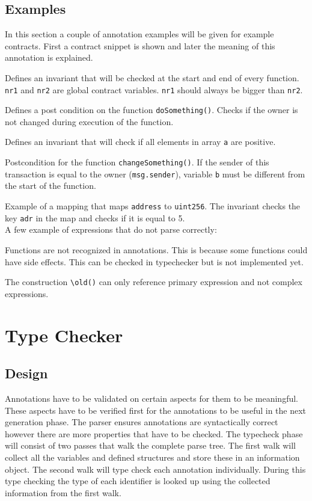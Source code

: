 \documentclass[a4paper]{article}
\begin{document}
\subsection{Examples}
In this section a couple of annotation examples will be given for example contracts. First a contract snippet is shown and later the meaning of this annotation is explained.

Defines an invariant that will be checked at the start and end of every function. \texttt{nr1} and \texttt{nr2} are global contract variables. \texttt{nr1} should always be bigger than \texttt{nr2}.

Defines a post condition on the function \texttt{doSomething()}. Checks if the owner is not changed during execution of the function.

Defines an invariant that will check if all elements in array \texttt{a} are positive.

Postcondition for the function \texttt{changeSomething()}. If the sender of this transaction is equal to the owner (\texttt{msg.sender}), variable \texttt{b} must be different from the start of the function. 

Example of a mapping that maps \texttt{address} to \texttt{uint256}. The invariant checks the key \texttt{adr} in the map and checks if it is equal to 5. \hfill\\
A few example of expressions that do not parse correctly:

Functions are not recognized in annotations. This is because some functions could have side effects. This can be checked in typechecker but is not implemented yet.

The construction \texttt{\textbackslash old()} can only reference primary expression and not complex expressions.

\newpage
\section{Type Checker}
\label{sec:typechecker}
\subsection{Design}
Annotations have to be validated on certain aspects for them to be meaningful. These aspects have to be verified first for the annotations to be useful in the next generation phase. The parser ensures annotations are syntactically correct however there are more properties that have to be checked. The typecheck phase will consist of two passes that walk the complete parse tree. The first walk will collect all the variables and defined structures and store these in an information object. The second walk will type check each annotation individually. During this type checking the type of each identifier is looked up using the collected information from the first walk. 
\end{document}
